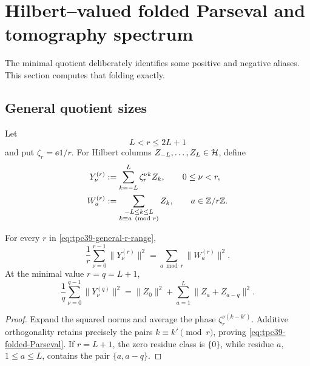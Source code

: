\section{Hilbert--valued folded Parseval and tomography spectrum}
\label{sec:tpc39-folded}

The minimal quotient deliberately identifies some positive and negative
aliases.  This section computes that folding exactly.

\subsection{General quotient sizes}

Let
\begin{equation}
 L<r\le2L+1
 \label{eq:tpc39-general-r-range}
\end{equation}
and put \(\zeta_r=\ee{1/r}\).  For Hilbert columns
\(Z_{-L},\ldots,Z_L\in\mathcal H\), define
\begin{align}
 Y_\nu^{(r)}
 &:=\sum_{k=-L}^{L}\zeta_r^{\nu k}Z_k,
 \qquad 0\le\nu<r,
 \label{eq:tpc39-general-twists}\\
 W_a^{(r)}
 &:=\sum_{\substack{-L\le k\le L\\k\equiv a\pmod r}}Z_k,
 \qquad a\in\mathbb Z/r\mathbb Z.
 \label{eq:tpc39-residue-buckets}
\end{align}

\begin{theorem}
\label{thm:tpc39-folded-Parseval}
For every \(r\) in \eqref{eq:tpc39-general-r-range},
\begin{equation}
 \boxed{
 \frac1r\sum_{\nu=0}^{r-1}\|Y_\nu^{(r)}\|^2
 =\sum_{a\bmod r}\|W_a^{(r)}\|^2.}
 \label{eq:tpc39-folded-Parseval}
\end{equation}
At the minimal value \(r=q=L+1\),
\begin{equation}
 \boxed{
 \frac1q\sum_{\nu=0}^{q-1}\|Y_\nu^{(q)}\|^2
 =\|Z_0\|^2+
 \sum_{a=1}^{L}\|Z_a+Z_{a-q}\|^2.}
 \label{eq:tpc39-minimal-folded-Parseval}
\end{equation}
\end{theorem}

\begin{proof}
Expand the squared norms and average the phase
\(\zeta_r^{\nu(k-k')}\).  Additive orthogonality retains precisely the
pairs \(k\equiv k'\pmod r\), proving
\eqref{eq:tpc39-folded-Parseval}.  If \(r=L+1\), the zero residue class is
\(\{0\}\), while residue \(a\), \(1\le a\le L\), contains the pair
\(\{a,a-q\}\).
\end{proof}

